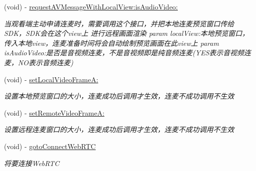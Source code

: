 \begin{DoxyCompactItemize}
\mbox{\label{interface_request_data_a09409a59e7cafc7573f2692d5d951851}} 
(void) -\/ \hyperlink{interface_request_data_a09409a59e7cafc7573f2692d5d951851}{request\+A\+V\+Message\+With\+Local\+View\+:is\+Audio\+Video\+:}
\begin{DoxyCompactList}\small\item\em 当观看端主动申请连麦时，需要调用这个接口，并把本地连麦预览窗口传给\+S\+D\+K，\+S\+D\+K会在这个view上 进行远程画面渲染 param local\+View\+:本地预览窗口，传入本地view，连麦准备时间将会自动绘制预览画面在此view上 param is\+Audio\+Video\+:是否是音视频连麦，不是音视频即是纯音频连麦(Y\+E\+S表示音视频连麦，\+N\+O表示音频连麦) \end{DoxyCompactList}\item 
\mbox{\label{interface_request_data_a8172beb9c4d7a8fc9b19610c671f827f}} 
(void) -\/ \hyperlink{interface_request_data_a8172beb9c4d7a8fc9b19610c671f827f}{set\+Local\+Video\+Frame\+A\+:}
\begin{DoxyCompactList}\small\item\em 设置本地预览窗口的大小，连麦成功后调用才生效，连麦不成功调用不生效 \end{DoxyCompactList}\item 
\mbox{\label{interface_request_data_a4d582d2ae5f8d0db746bd6652934e9dd}} 
(void) -\/ \hyperlink{interface_request_data_a4d582d2ae5f8d0db746bd6652934e9dd}{set\+Remote\+Video\+Frame\+A\+:}
\begin{DoxyCompactList}\small\item\em 设置远程连麦窗口的大小，连麦成功后调用才生效，连麦不成功调用不生效 \end{DoxyCompactList}\item 
\mbox{\label{interface_request_data_a73cdccb2fbc387504c9de85443b047a6}} 
(void) -\/ \hyperlink{interface_request_data_a73cdccb2fbc387504c9de85443b047a6}{goto\+Connect\+Web\+R\+TC}
\begin{DoxyCompactList}\small\item\em 将要连接\+Web\+R\+TC \end{DoxyCompactList}\end{DoxyCompactItemize}
